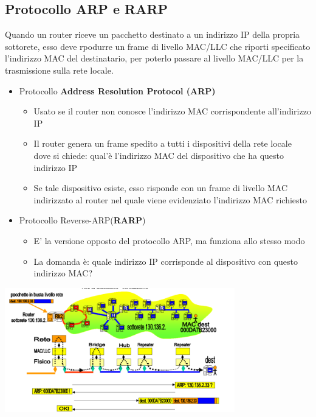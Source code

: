 \documentclass{article}
\begin{document}
\subsection{Protocollo ARP e RARP}
Quando un router riceve un pacchetto destinato a un indirizzo IP della propria sottorete, esso deve rpodurre un frame di livello MAC/LLC che riporti specificato l'indirizzo MAC del destinatario, per poterlo passare al livello MAC/LLC per la trasmissione sulla rete locale.
\begin{itemize}
  \item Protocollo \textbf{Address Resolution Protocol (ARP)} 
\begin{itemize}
  \item Usato se il router non conosce l'indirizzo MAC corrispondente all'indirizzo IP
  \item Il router genera un frame spedito a tutti i dispositivi della rete locale dove si chiede: qual'è l'indirizzo MAC del dispositivo che ha questo indirizzo IP
  \item Se tale dispositivo esiste, esso risponde con un frame di livello MAC indirizzato al router nel quale viene evidenziato l'indirizzo MAC richiesto
\end{itemize}
\item Protocollo Reverse-ARP(\textbf{RARP})
\begin{itemize}
  \item E' la versione opposto del protocollo ARP, ma funziona allo stesso modo
  \item La domanda è: quale indirizzo IP corrisponde al dispositivo con questo indirizzo MAC?
\end{itemize}
\end{itemize}
\begin{center}
  \includegraphics[width=10cm]{img/arp.png}
\end{center}
\end{document}
